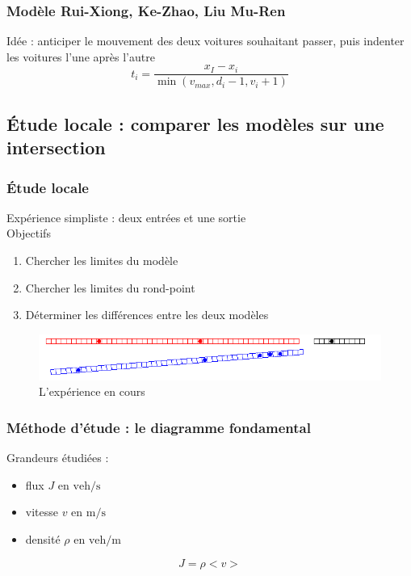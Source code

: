 \documentclass[slidetop,11pt]{beamer}
\begin{document}
	
\begin{frame}
	\frametitle{Modèle Rui-Xiong, Ke-Zhao, Liu Mu-Ren}
	Idée : anticiper le mouvement des deux voitures souhaitant passer, puis indenter les voitures l'une après l'autre
		\begin{equation}
			t_i = \frac{x_I - x_i}{\min(v_{max},d_i-1,v_i+1)}
		\end{equation}
\end{frame}
	\subsection{Étude locale : comparer les modèles sur une intersection}

\begin{frame}
	\frametitle{Étude locale}
	Expérience simpliste : deux entrées et une sortie \\
	Objectifs
	\begin{enumerate}
		\item Chercher les limites du modèle
	 	\item Chercher les limites du rond-point
		\item Déterminer les différences entre les deux modèles
	\end{enumerate}
	\begin{figure}
		\begin{center}
			\includegraphics[scale=0.5]{./images/localdebut}	
		\end{center}
		\caption{L'expérience en cours}
	\end{figure}		
\end{frame}	

\begin{frame}
	\frametitle{Méthode d'étude : le diagramme fondamental}
	Grandeurs étudiées : 
	\begin{itemize}
		\item flux $J \text{ en } \mathrm{veh}/\mathrm{s}$
		\item vitesse $v \text{ en } \mathrm{m}/\mathrm{s}$
		\item densité $\rho \text{ en } \mathrm{veh}/\mathrm{m}$
	\end{itemize}
	$$J = \rho<v>$$
\end{frame}
\end{document}

